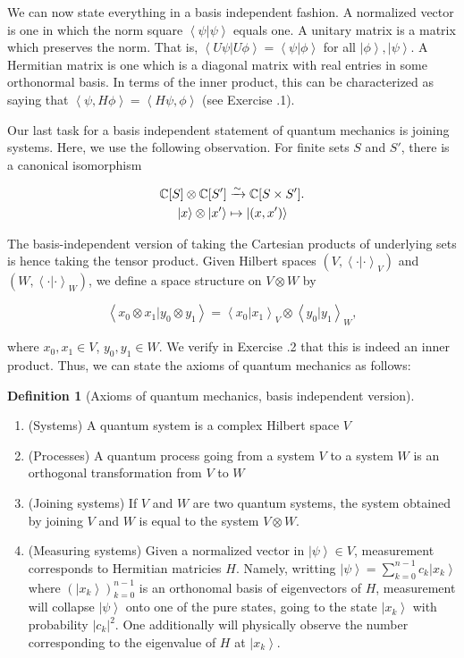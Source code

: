 \documentclass{article}
\theoremstyle{definition}
\newtheorem*{definition}{Definition}
\numberwithin{figure}{section}
\begin{document}
We can now state everything in a basis independent fashion. A normalized vector is one in which the norm square $\left<\psi|\psi\right>$ equals one. A unitary matrix is a matrix which preserves the norm. That is, $\left<U\psi|U\phi\right>=\left<\psi|\phi\right>$ for all $\left|\phi\right>,\left|\psi\right>$. A Hermitian matrix is one which is a diagonal matrix with real entries in some orthonormal basis. In terms of the inner product, this can be characterized as saying that $\left<\psi, H\phi\right>=\left<H\psi, \phi \right>$ (see Exercise \thesection.1).

Our last task for a basis independent statement of quantum mechanics is joining systems. Here, we use the following observation. For finite sets $S$ and $S'$, there is a canonical isomorphism

\begin{align*}
\mathbb{C}[S]\otimes \mathbb{C}[S']&\xrightarrow{\sim}\mathbb{C}[S\times S'].\\
\left|x\right>\otimes \left|x'\right>&\mapsto \left|(x,x')\right>
\end{align*}

The basis-independent version of taking the Cartesian products of underlying sets is hence taking the tensor product. Given Hilbert spaces $(V,\left<\cdot|\cdot\right>_V)$ and $(W,\left<\cdot|\cdot\right>_W)$, we define a  space structure on $V\otimes W$ by

$$\left<x_0\otimes x_1| y_0\otimes y_1\right>=\left<x_0|x_1\right>_{V}\otimes \left<y_0|y_1\right>_W,$$

where $x_0,x_1\in V$, $y_0,y_1\in W$. We verify in Exercise \thesection.2 that this is indeed an inner product. Thus, we can state the axioms of quantum mechanics as follows:

\begin{definition}[Axioms of quantum mechanics, basis independent version] $\,$

\begin{enumerate}
\item (Systems) A quantum system is a complex Hilbert space $V$
\item (Processes) A quantum process going from a system $V$ to a system $W$ is an orthogonal transformation from $V$ to $W$
\item (Joining systems) If $V$ and $W$ are two quantum systems, the system obtained by joining $V$ and $W$ is equal to the system $V\otimes W$.
\item (Measuring systems) Given a normalized vector in $\left|\psi\right>\in V$, measurement corresponds to Hermitian matricies $H$. Namely, writting $\left|\psi\right>=\sum_{k=0}^{n-1}c_k\left|x_k\right>$ where $\left(\left|x_k\right>\right)_{k=0}^{n-1}$ is an orthonomal basis of eigenvectors of $H$, measurement will collapse $\left|\psi\right>$ onto one of the pure states, going to the state $\left|x_k\right>$ with probability $|c_k|^2$. One additionally will physically observe the number corresponding to the eigenvalue of $H$ at $\left|x_k\right>$.
\end{enumerate}

\raggedleft\qedsymbol{}
\end{definition}
\end{document}
